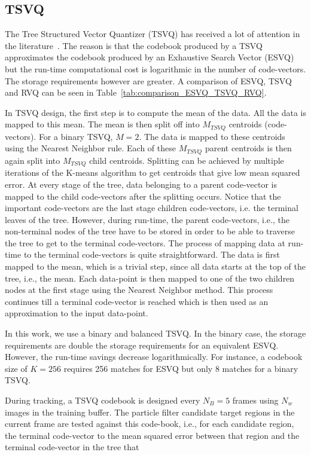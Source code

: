 \subsection{TSVQ}
\label{Sec:Chap5_TSVQ}
The Tree Structured Vector Quantizer (TSVQ) has received a lot of attention in the literature~\cite{1991_BOOK_VQ_GershoGray}.  The reason is that the codebook produced by a TSVQ approximates the codebook produced by an Exhaustive Search Vector (ESVQ) but the run-time computational cost is logarithmic in the number of code-vectors.  The storage requirements however are greater.  A comparison of ESVQ, TSVQ and RVQ can be seen in Table~\ref{tab:comparison_ESVQ_TSVQ_RVQ}.

In TSVQ design, the first step is to compute the mean of the data.  All the data is mapped to this mean.  The mean is then split off into $M_{TSVQ}$ centroids (code-vectors).  For a binary TSVQ, $M=2$.  The data is mapped to these centroids using the Nearest Neighbor rule.  Each of these $M_{TSVQ}$ parent centroids is then again split into $M_{TSVQ}$ child centroids.  Splitting can be achieved by multiple iterations of the K-means algorithm to get centroids that give low mean squared error.  At every stage of the tree, data belonging to a parent code-vector is mapped to the child code-vectors after the splitting occurs.  Notice that the important code-vectors are the last stage children code-vectors, i.e. the terminal leaves of the tree.  However, during run-time, the parent code-vectors, i.e., the non-terminal nodes of the tree have to be stored in order to be able to traverse the tree to get to the terminal code-vectors.  The process of mapping data at run-time to the terminal code-vectors is quite straightforward.  The data is first mapped to the mean, which is a trivial step, since all data starts at the top of the tree, i.e., the mean.  Each data-point is then mapped to one of the two children nodes at the first stage using the Nearest Neighbor method.  This process continues till a terminal code-vector is reached which is then used as an approximation to the input data-point.

In this work, we use a binary and balanced TSVQ.  In the binary case, the storage requirements are double the storage requirements for an equivalent ESVQ.  However, the run-time savings decrease logarithmically.  For instance, a codebook size of $K=256$ requires 256 matches for ESVQ but only 8 matches for a binary TSVQ.  

During tracking, a TSVQ codebook is designed every $N_B=5$ frames using $N_w$ images in the training buffer.  The particle filter candidate target regions in the current frame are tested against this code-book, i.e., for each candidate region, the terminal code-vector  to the mean squared error between that region and the terminal code-vector in the tree that 

